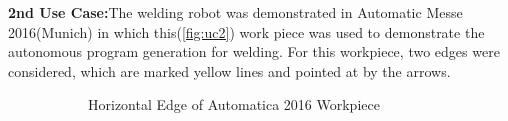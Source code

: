 \textbf{2nd Use Case:}The welding robot was demonstrated in Automatic Messe 2016(Munich) in which this(\ref{fig:uc2}) work piece was used to demonstrate the autonomous program generation for welding. For this workpiece, two edges were considered, which are marked yellow lines and pointed at by the arrows.
\begin{figure}[!htbp] %
	\centering
	\begin{subfigure}[b]{0.4\textwidth}
		\caption{Horizontal Edge of Automatica 2016 Workpiece}  
	\end{subfigure}
	\begin{subfigure}[b]{0.4\textwidth}

\end{subfigure}
\end{figure}

